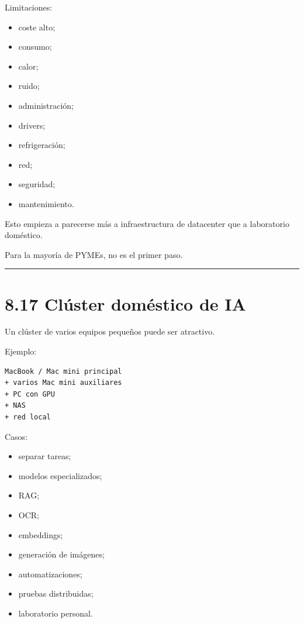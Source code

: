 Limitaciones:

\begin{itemize}
\tightlist
\item
  coste alto;
\item
  consumo;
\item
  calor;
\item
  ruido;
\item
  administración;
\item
  drivers;
\item
  refrigeración;
\item
  red;
\item
  seguridad;
\item
  mantenimiento.
\end{itemize}

Esto empieza a parecerse más a infraestructura de datacenter que a
laboratorio doméstico.

Para la mayoría de PYMEs, no es el primer paso.

\begin{center}\rule{0.5\linewidth}{0.5pt}\end{center}

\section{8.17 Clúster doméstico de
IA}\label{cluxfaster-domuxe9stico-de-ia}

Un clúster de varios equipos pequeños puede ser atractivo.

Ejemplo:

\begin{lstlisting}
MacBook / Mac mini principal
+ varios Mac mini auxiliares
+ PC con GPU
+ NAS
+ red local
\end{lstlisting}

Casos:

\begin{itemize}
\tightlist
\item
  separar tareas;
\item
  modelos especializados;
\item
  RAG;
\item
  OCR;
\item
  embeddings;
\item
  generación de imágenes;
\item
  automatizaciones;
\item
  pruebas distribuidas;
\item
  laboratorio personal.
\end{itemize}

